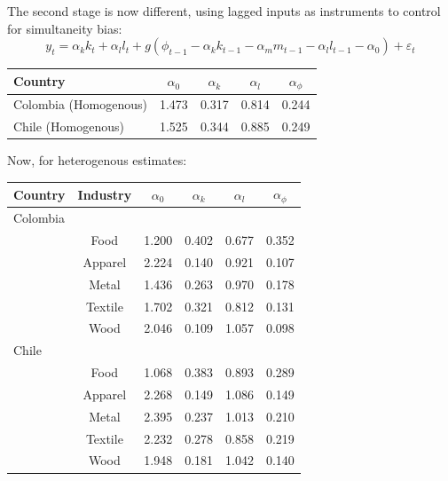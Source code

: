 \documentclass{article}
\begin{document}
The second stage is now different, using lagged inputs as instruments to control for simultaneity bias:
\begin{equation}
  y_t = \alpha_k k_t + \alpha_l l_t + g(\phi_{t-1} - \alpha_k k_{t-1} - \alpha_m m_{t-1} - \alpha_l l_{t-1} - \alpha_0) + \varepsilon_t
\end{equation}

\begin{center}
\begin{tabular}[h]{|lcccc|}
  \hline
  \textbf{Country} & \textbf{$\alpha_0$} & \textbf{$\alpha_k$} & \textbf{$\alpha_l$} & \textbf{$\alpha_{\phi}$} \\
  \hline
  Colombia (Homogenous) & 1.473 & 0.317 & 0.814 & 0.244 \\
  Chile (Homogenous) & 1.525 & 0.344 & 0.885 & 0.249 \\
  \hline
\end{tabular}
\end{center}

\vspace{1cm}
Now, for heterogenous estimates:
\begin{center}
\begin{tabular}[h]{|lccccc|}
  \hline
  \textbf{Country} & \textbf{Industry} & \textbf{$\alpha_0$} & \textbf{$\alpha_k$} & \textbf{$\alpha_l$} & \textbf{$\alpha_{\phi}$} \\
  \hline
  \hline
  Colombia & & & & & \\
  \hline
   & Food & 1.200 & 0.402 & 0.677 & 0.352 \\
   & Apparel & 2.224 & 0.140 & 0.921 & 0.107 \\
   & Metal & 1.436 & 0.263 & 0.970 & 0.178 \\
   & Textile & 1.702 & 0.321 & 0.812 & 0.131 \\
   & Wood & 2.046 & 0.109 & 1.057 & 0.098 \\
   \hline
  Chile & & & & & \\
  \hline
   & Food & 1.068 & 0.383 & 0.893 & 0.289 \\
   & Apparel & 2.268 & 0.149 & 1.086 & 0.149 \\
   & Metal & 2.395 & 0.237 & 1.013 & 0.210 \\
   & Textile & 2.232 & 0.278 & 0.858 & 0.219 \\
   & Wood & 1.948 & 0.181 & 1.042 & 0.140 \\
   \hline
\end{tabular}
\end{center}
\end{document}
